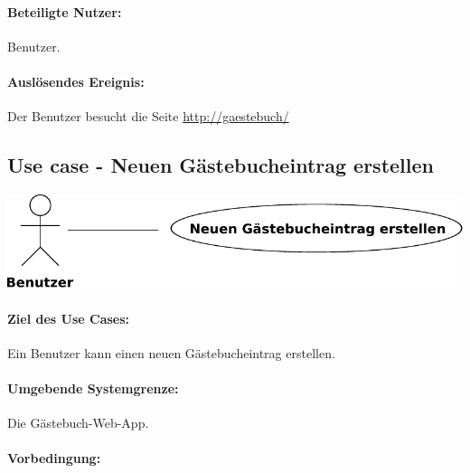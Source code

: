 \paragraph{Beteiligte Nutzer:}

\begin{asparaitem}
\item Benutzer.
\end{asparaitem}

\paragraph{Auslösendes Ereignis:}

\begin{asparaitem}
\item Der Benutzer besucht die Seite \url{http://gaestebuch/}
\end{asparaitem}

\subsection{Use case - Neuen Gästebucheintrag erstellen}

\begin{figurehere}
\includegraphics[width=\columnwidth]{use-case-new_entry}
\end{figurehere}

\paragraph{Ziel des Use Cases:}

\begin{asparaitem}
\item Ein Benutzer kann einen neuen Gästebucheintrag erstellen.
\end{asparaitem}

\paragraph{Umgebende Systemgrenze:}

Die Gästebuch-Web-App.

\paragraph{Vorbedingung:}

